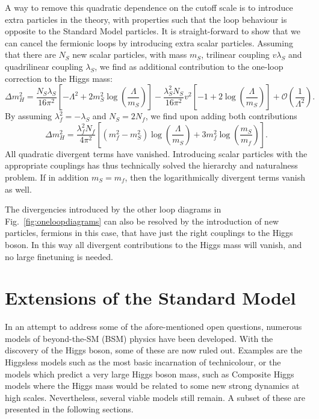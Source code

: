 A way to remove this quadratic dependence on the cutoff scale is to introduce extra particles in
the theory, with properties such that the loop behaviour is opposite to the Standard Model
particles. It is straight-forward to show that we can cancel the fermionic loops by introducing
extra scalar particles. 
Assuming that there are $N_S$ new scalar particles, with mass $m_S$, trilinear coupling $v\lambda_S$
and quadrilinear coupling $\lambda_S$, we find as additional contribution to the
one-loop correction to the Higgs mass:
\begin{equation}
  \Delta m_H^2 =  \frac{N_S\lambda_S}{16\pi^2} \left[ - \Lambda^2 + 2 m_S^2 \log
\left(\frac{\Lambda}{m_S}\right)\right] - \frac{\lambda_S^2 N_S}{16 \pi^2} v^2 \left[ -1 + 2
\log\left(\frac{\Lambda}{m_S}\right) \right] + \mathcal{O}\left(\frac{1}{\Lambda^2}\right) .
\end{equation}
By assuming $\lambda_f^2 = - \lambda_S$ and $N_S = 2 N_f$, we find upon adding both
contributions
\begin{equation}
  \Delta m_H^2 = \frac{\lambda_f^2 N_f}{4\pi^2} \left[ \left(m_f^2-m_S^2\right)
\log\left(\frac{\Lambda}{m_S}\right) + 3 m_f^2 \log\left(\frac{m_S}{m_f}\right) \right] .
\end{equation}
All quadratic divergent terms have vanished. Introducing scalar particles with the
appropriate couplings has thus technically solved the hierarchy and naturalness problem. 
If in addition $m_S = m_f$, then the logarithmically divergent terms vanish as well. 

The divergencies introduced by the other loop diagrams in Fig.~\ref{fig:oneloopdiagrams} can also be
resolved by the introduction of new particles, fermions in this case, that have just the right
couplings to the Higgs boson. In this way all divergent contributions to the Higgs mass will
vanish, and no large finetuning is needed. 


\section{Extensions of the Standard Model \label{sec:extensions_standard_model}}


In an attempt to address some of the afore-mentioned open questions, numerous models of
beyond-the-SM (BSM) physics have been developed. With the discovery of the Higgs boson, some of
these are now ruled out. Examples are the Higgsless models such as the most basic incarnation of
technicolour, or the models which predict a very large Higgs boson mass, such as Composite Higgs
models where the Higgs mass would be related to some new strong dynamics at high scales. 
Nevertheless, several viable models still remain. A subset of these are presented in the following
sections.

